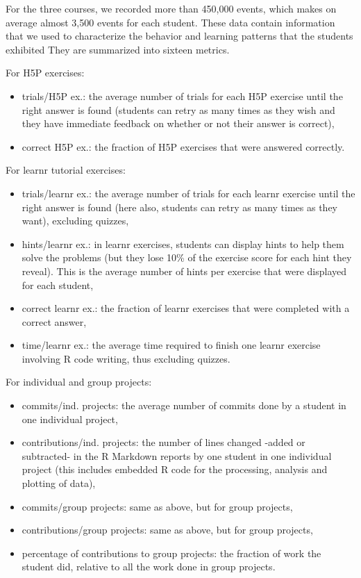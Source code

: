 \documentclass{aims} %
\theoremstyle{definition}
\begin{document}
For the three courses, we recorded more than 450,000 events, which makes
on average almost 3,500 events for each student. These data contain
information that we used to characterize the behavior and learning
patterns that the students exhibited They are summarized into sixteen
metrics.

For H5P exercises:

\begin{itemize}
\item
  trials/H5P ex.: the average number of trials for each H5P exercise
  until the right answer is found (students can retry as many times as
  they wish and they have immediate feedback on whether or not their
  answer is correct),
\item
  correct H5P ex.: the fraction of H5P exercises that were answered
  correctly.
\end{itemize}

For learnr tutorial exercises:

\begin{itemize}
\item
  trials/learnr ex.: the average number of trials for each learnr
  exercise until the right answer is found (here also, students can
  retry as many times as they want), excluding quizzes,
\item
  hints/learnr ex.: in learnr exercises, students can display hints to
  help them solve the problems (but they lose 10\% of the exercise score
  for each hint they reveal). This is the average number of hints per
  exercise that were displayed for each student,
\item
  correct learnr ex.: the fraction of learnr exercises that were
  completed with a correct answer,
\item
  time/learnr ex.: the average time required to finish one learnr
  exercise involving R code writing, thus excluding quizzes.
\end{itemize}

For individual and group projects:

\begin{itemize}
\item
  commits/ind. projects: the average number of commits done by a student
  in one individual project,
\item
  contributions/ind. projects: the number of lines changed -added or
  subtracted- in the R Markdown reports by one student in one individual
  project (this includes embedded R code for the processing, analysis
  and plotting of data),
\item
  commits/group projects: same as above, but for group projects,
\item
  contributions/group projects: same as above, but for group projects,
\item
  percentage of contributions to group projects: the fraction of work
  the student did, relative to all the work done in group projects.
\end{itemize}
\end{document}
